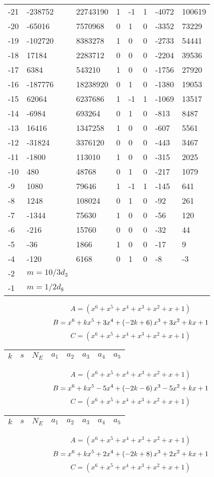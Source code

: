\documentclass{amsart}
\begin{document}
\begin{longtable}{|l|l|l|lllll|}
-21&-238752&22743190&1&-1&1&-4072&100619\\
-20&-65016&7570968&0&1&0&-3352&73229\\
-19&-102720&8383278&1&0&0&-2733&54441\\
-18&17184&2283712&0&0&0&-2204&39536\\
-17&6384&543210&1&0&0&-1756&27920\\
-16&-187776&18238920&0&1&0&-1380&19053\\
-15&62064&6237686&1&-1&1&-1069&13517\\
-14&-6984&693264&0&1&0&-813&8487\\
-13&16416&1347258&1&0&0&-607&5561\\
-12&-31824&3376120&0&0&0&-443&3467\\
-11&-1800&113010&1&0&0&-315&2025\\
-10&480&48768&0&1&0&-217&1079\\
-9&1080&79646&1&-1&1&-145&641\\
-8&1248&108024&0&1&0&-92&261\\
-7&-1344&75630&1&0&0&-56&120\\
-6&-216&15760&0&0&0&-32&44\\
-5&-36&1866&1&0&0&-17&9\\
-4&-120&6168&0&1&0&-8&-3\\
-2&$m=10/3d_{3}$&&\multicolumn{5}{c|}{}\\
-1&$m=1/2d_{8}$&&\multicolumn{5}{c|}{}\\
\hline
\end{longtable}
$$A=(x^6
 + x^5
 + x^4
 + x^3
 + x^2
 + x
 + 1)$$
$$B=x^6
 + k\*x^5
 + 3\*x^4
 + \left(-2\*k
 + 6\right) \*x^3
 + 3\*x^2
 + k\*x
 + 1$$
$$C=(x^6
 + x^5
 + x^4
 + x^3
 + x^2
 + x
 + 1)$$
\begin{longtable}{|l|l|l|lllll|}
\hline
$k$ & $s$ & $N_E$ & $a_1$ & $a_2$ & $a_3$ & $a_4$ & $a_5$\\
\hline
\hline
\end{longtable}
$$A=(x^6
 + x^5
 + x^4
 + x^3
 + x^2
 + x
 + 1)$$
$$B=x^6
 + k\*x^5
 - 5\*x^4
 + \left(-2\*k
 - 6\right) \*x^3
 - 5\*x^2
 + k\*x
 + 1$$
$$C=(x^6
 + x^5
 + x^4
 + x^3
 + x^2
 + x
 + 1)$$
\begin{longtable}{|l|l|l|lllll|}
\hline
$k$ & $s$ & $N_E$ & $a_1$ & $a_2$ & $a_3$ & $a_4$ & $a_5$\\
\hline
\hline
\end{longtable}
$$A=(x^6
 + x^5
 + x^4
 + x^3
 + x^2
 + x
 + 1)$$
$$B=x^6
 + k\*x^5
 + 2\*x^4
 + \left(-2\*k
 + 8\right) \*x^3
 + 2\*x^2
 + k\*x
 + 1$$
$$C=(x^6
 + x^5
 + x^4
 + x^3
 + x^2
 + x
 + 1)$$
\end{document}

